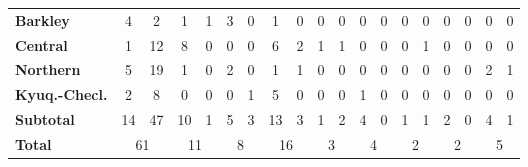 \begin{table}[H]
{\begin{tabular}{lcccccccccccccccccc}
\multicolumn{1}{l|}{\textbf{Barkley}} & \multicolumn{1}{c|}{4} & \multicolumn{1}{c|}{2} & \multicolumn{1}{c|}{1} & \multicolumn{1}{c|}{1} & \multicolumn{1}{c|}{3} & \multicolumn{1}{c|}{0} & \multicolumn{1}{c|}{1} & \multicolumn{1}{c|}{0} & \multicolumn{1}{c|}{0} & \multicolumn{1}{c|}{0} & \multicolumn{1}{c|}{0} & \multicolumn{1}{c|}{0} & \multicolumn{1}{c|}{0} & \multicolumn{1}{c|}{0} & \multicolumn{1}{c|}{0} & \multicolumn{1}{c|}{0} & \multicolumn{1}{c|}{0} & \multicolumn{1}{c|}{0} \\ \cline{2-19} 
\multicolumn{1}{l|}{\textbf{Central}} & \multicolumn{1}{c|}{1} & \multicolumn{1}{c|}{12} & \multicolumn{1}{c|}{8} & \multicolumn{1}{c|}{0} & \multicolumn{1}{c|}{0} & \multicolumn{1}{c|}{0} & \multicolumn{1}{c|}{6} & \multicolumn{1}{c|}{2} & \multicolumn{1}{c|}{1} & \multicolumn{1}{c|}{1} & \multicolumn{1}{c|}{0} & \multicolumn{1}{c|}{0} & \multicolumn{1}{c|}{0} & \multicolumn{1}{c|}{1} & \multicolumn{1}{c|}{0} & \multicolumn{1}{c|}{0} & \multicolumn{1}{c|}{0} & \multicolumn{1}{c|}{0} \\ \cline{2-19} 
\multicolumn{1}{l|}{\textbf{Northern}} & \multicolumn{1}{c|}{5} & \multicolumn{1}{c|}{19} & \multicolumn{1}{c|}{1} & \multicolumn{1}{c|}{0} & \multicolumn{1}{c|}{2} & \multicolumn{1}{c|}{0} & \multicolumn{1}{c|}{1} & \multicolumn{1}{c|}{1} & \multicolumn{1}{c|}{0} & \multicolumn{1}{c|}{0} & \multicolumn{1}{c|}{0} & \multicolumn{1}{c|}{0} & \multicolumn{1}{c|}{0} & \multicolumn{1}{c|}{0} & \multicolumn{1}{c|}{0} & \multicolumn{1}{c|}{0} & \multicolumn{1}{c|}{2} & \multicolumn{1}{c|}{1} \\ \cline{2-19} 
\multicolumn{1}{l|}{\textbf{Kyuq.-Checl.}} & \multicolumn{1}{c|}{2} & \multicolumn{1}{c|}{8} & \multicolumn{1}{c|}{0} & \multicolumn{1}{c|}{0} & \multicolumn{1}{c|}{0} & \multicolumn{1}{c|}{1} & \multicolumn{1}{c|}{5} & \multicolumn{1}{c|}{0} & \multicolumn{1}{c|}{0} & \multicolumn{1}{c|}{0} & \multicolumn{1}{c|}{1} & \multicolumn{1}{c|}{0} & \multicolumn{1}{c|}{0} & \multicolumn{1}{c|}{0} & \multicolumn{1}{c|}{0} & \multicolumn{1}{c|}{0} & \multicolumn{1}{c|}{0} & \multicolumn{1}{c|}{0} \\ \cline{2-19} 
\multicolumn{1}{l|}{\textbf{Subtotal}} & \multicolumn{1}{c|}{14} & \multicolumn{1}{c|}{47} & \multicolumn{1}{c|}{10} & \multicolumn{1}{c|}{1} & \multicolumn{1}{c|}{5} & \multicolumn{1}{c|}{3} & \multicolumn{1}{c|}{13} & \multicolumn{1}{c|}{3} & \multicolumn{1}{c|}{1} & \multicolumn{1}{c|}{2} & \multicolumn{1}{c|}{4} & \multicolumn{1}{c|}{0} & \multicolumn{1}{c|}{1} & \multicolumn{1}{c|}{1} & \multicolumn{1}{c|}{2} & \multicolumn{1}{c|}{0} & \multicolumn{1}{c|}{4} & \multicolumn{1}{c|}{1} \\ \cline{2-19} 
\multicolumn{1}{l|}{\textbf{Total}} & \multicolumn{2}{c|}{61} & \multicolumn{2}{c|}{11} & \multicolumn{2}{c|}{8} & \multicolumn{2}{c|}{16} & \multicolumn{2}{c|}{3} & \multicolumn{2}{c|}{4} & \multicolumn{2}{c|}{2} & \multicolumn{2}{c|}{2} & \multicolumn{2}{c|}{5} \\ \cline{2-19} 
\end{tabular}
}
\end{table}

